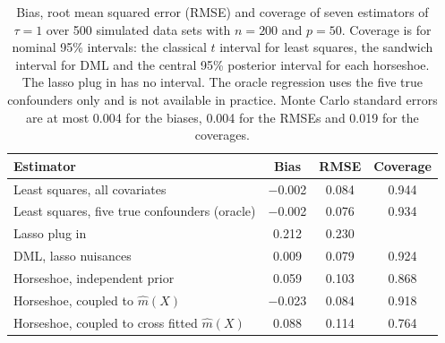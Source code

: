 \begin{table}[ht]
\centering
\small
\caption{Bias, root mean squared error (RMSE) and coverage of seven estimators of $\tau = 1$ over 500 simulated data sets with $n = 200$ and $p = 50$. Coverage is for nominal 95\% intervals: the classical $t$ interval for least squares, the sandwich interval for DML and the central 95\% posterior interval for each horseshoe. The lasso plug in has no interval. The oracle regression uses the five true confounders only and is not available in practice. Monte Carlo standard errors are at most 0.004 for the biases, 0.004 for the RMSEs and 0.019 for the coverages.}
\label{tab:ric}
\begin{tabular}{@{}>{\raggedright\arraybackslash}p{2.3in}ccc@{}}
\toprule
Estimator & Bias & RMSE & Coverage \\
\midrule
Least squares, all covariates & $-$0.002 & 0.084 & 0.944 \\
Least squares, five true confounders (oracle) & $-$0.002 & 0.076 & 0.934 \\
Lasso plug in & 0.212 & 0.230 &  \\
DML, lasso nuisances & 0.009 & 0.079 & 0.924 \\
Horseshoe, independent prior & 0.059 & 0.103 & 0.868 \\
Horseshoe, coupled to $\hat m(X)$ & $-$0.023 & 0.084 & 0.918 \\
Horseshoe, coupled to cross fitted $\hat m(X)$ & 0.088 & 0.114 & 0.764 \\
\bottomrule
\end{tabular}
\end{table}
